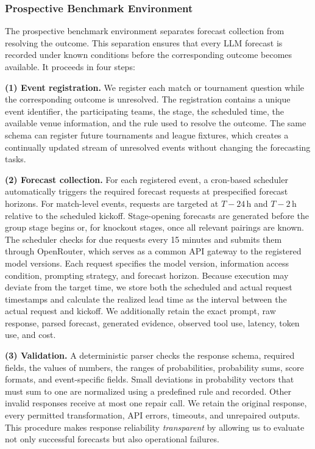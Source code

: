 \documentclass[sigconf,nonacm]{acmart}
\begin{document}
\subsubsection{Prospective Benchmark Environment}
\label{sec:prospective-process}

The prospective benchmark environment separates forecast collection from resolving the outcome. This separation ensures that every LLM forecast is recorded under known conditions before the corresponding outcome becomes available. It proceeds in four steps:

\textbf{(1) Event registration.}
We register each match or tournament question while the corresponding outcome is unresolved. The registration contains a unique event identifier, the participating teams, the stage, the scheduled time, the available venue information, and the rule used to resolve the outcome. The same schema can register future tournaments and league fixtures, which creates a continually updated stream of unresolved events without changing the forecasting tasks.

\textbf{(2) Forecast collection.}
For each registered event, a cron-based scheduler automatically triggers the required forecast requests at prespecified forecast horizons. For match-level events, requests are targeted at $T-24$\,h and $T-2$\,h relative to the scheduled kickoff. Stage-opening forecasts are generated before the group stage begins or, for knockout stages, once all relevant pairings are known. The scheduler checks for due requests every 15 minutes and submits them through OpenRouter, which serves as a common API gateway to the registered model versions. Each request specifies the model version,
information access condition, prompting strategy, and forecast horizon. Because execution may deviate from the target time, we store both the scheduled and actual request timestamps and calculate the realized lead time as the interval between the actual request and kickoff. We additionally retain the exact prompt, raw response, parsed forecast, generated evidence, observed tool use, latency, token use, and cost.

\textbf{(3) Validation.}
A deterministic parser checks the response schema, required fields, the values of numbers, the ranges of probabilities, probability sums, score formats, and event-specific fields. Small deviations in probability vectors that must sum to one are normalized using a predefined rule and recorded. Other invalid responses receive at most one repair call. We retain the original response, every permitted transformation, API errors, timeouts, and unrepaired outputs. This procedure makes response reliability \emph{transparent} by allowing us to evaluate not only successful forecasts but also operational failures.
\end{document}
